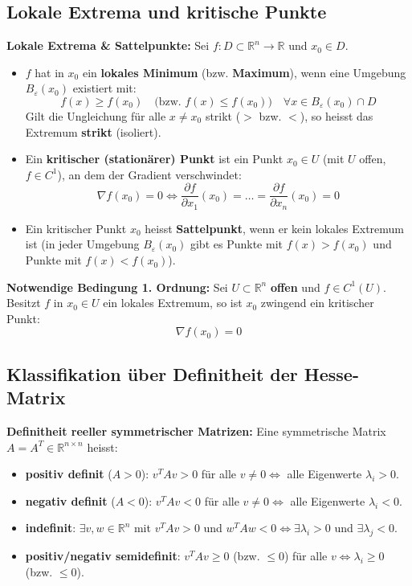 \subsection{Lokale Extrema und kritische Punkte}

\begin{definition}
    \textbf{Lokale Extrema \& Sattelpunkte:} Sei $f: D \subset \mathbb{R}^n \to \mathbb{R}$ und $x_0 \in D$.
    \begin{itemize}
        \item $f$ hat in $x_0$ ein \textbf{lokales Minimum} (bzw. \textbf{Maximum}), wenn eine Umgebung $B_\varepsilon(x_0)$ existiert mit:
        $$ f(x) \ge f(x_0) \quad \text{(bzw. } f(x) \le f(x_0) \text{)} \quad \forall x \in B_\varepsilon(x_0) \cap D $$
        Gilt die Ungleichung für alle $x \neq x_0$ strikt ($>$ bzw. $<$), so heisst das Extremum \textbf{strikt} (isoliert).
        \item Ein \textbf{kritischer (stationärer) Punkt} ist ein Punkt $x_0 \in U$ (mit $U$ offen, $f \in C^1$), an dem der Gradient verschwindet:
        $$ \nabla f(x_0) = 0 \iff \frac{\partial f}{\partial x_1}(x_0) = \dots = \frac{\partial f}{\partial x_n}(x_0) = 0 $$
        \item Ein kritischer Punkt $x_0$ heisst \textbf{Sattelpunkt}, wenn er kein lokales Extremum ist (in jeder Umgebung $B_\varepsilon(x_0)$ gibt es Punkte mit $f(x) > f(x_0)$ und Punkte mit $f(x) < f(x_0)$).
    \end{itemize}
\end{definition}

\begin{theorem}
    \textbf{Notwendige Bedingung 1. Ordnung:} Sei $U \subset \mathbb{R}^n$ \textbf{offen} und $f \in C^1(U)$.
    Besitzt $f$ in $x_0 \in U$ ein lokales Extremum, so ist $x_0$ zwingend ein kritischer Punkt:
    $$ \nabla f(x_0) = 0 $$
\end{theorem}

\subsection{Klassifikation über Definitheit der Hesse-Matrix}

\begin{definition}
    \textbf{Definitheit reeller symmetrischer Matrizen:} Eine symmetrische Matrix $A = A^T \in \mathbb{R}^{n \times n}$ heisst:
    \begin{itemize}
        \item \textbf{positiv definit} ($A > 0$): $v^T A v > 0$ für alle $v \neq 0 \iff$ alle Eigenwerte $\lambda_i > 0$.
        \item \textbf{negativ definit} ($A < 0$): $v^T A v < 0$ für alle $v \neq 0 \iff$ alle Eigenwerte $\lambda_i < 0$.
        \item \textbf{indefinit}: $\exists v, w \in \mathbb{R}^n$ mit $v^T A v > 0$ und $w^T A w < 0 \iff \exists \lambda_i > 0$ und $\exists \lambda_j < 0$.
        \item \textbf{positiv/negativ semidefinit}: $v^T A v \ge 0$ (bzw. $\le 0$) für alle $v \iff \lambda_i \ge 0$ (bzw. $\le 0$).
    \end{itemize}
\end{definition}

